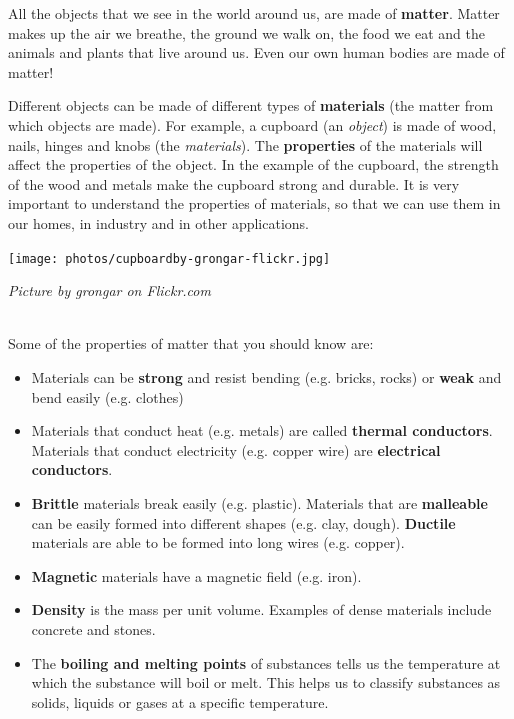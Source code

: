             \label{m38708*id62175}All the objects that we see in the world around us, are made of \textbf{matter}. Matter makes up the air we breathe, the ground we walk on, the food we eat and the animals and plants that live around us. Even our own human bodies are made of matter!\par 
\begin{minipage}{.5\textwidth}
      \label{m38708*id62185}Different objects can be made of different types of \textbf{materials} (the matter from which objects are made). For example, a cupboard (an \textsl{object}) is made of wood, nails, hinges and knobs (the \textsl{materials}). The \textbf{properties} of the materials will affect the properties of the object. In the example of the cupboard, the strength of the wood and metals make the cupboard strong and durable. It is very important to understand the properties of materials, so that we can use them in our homes, in industry and in other applications. \par 
\end{minipage}
\begin{minipage}{.5\textwidth}
\begin{center}
 \texttt{[image: photos/cupboardby-grongar-flickr.jpg]}\par
\textit{Picture by grongar on Flickr.com}
\end{center}
\end{minipage} \\
\label{m38708*id0132}Some of the properties of matter that you should know are:
\label{m38708*lid825}\begin{itemize}[noitemsep]
  \item Materials can be \textbf{strong} and resist bending (e.g. bricks, rocks) or \textbf{weak} and bend easily (e.g. clothes)
  \item Materials that conduct heat (e.g. metals) are called \textbf{thermal conductors}. Materials that conduct electricity (e.g. copper wire) are \textbf{electrical conductors}.
  \item \textbf{Brittle} materials break easily (e.g. plastic). Materials that are \textbf{malleable} can be easily formed into different shapes (e.g. clay, dough). \textbf{Ductile} materials are able to be formed into long wires (e.g. copper).
  \item \textbf{Magnetic} materials have a magnetic field (e.g. iron).
  \item \textbf{Density} is the mass per unit volume. Examples of dense materials include concrete and stones.
  \item The \textbf{boiling and melting points} of substances tells us the temperature at which the substance will boil or melt. This helps us to classify substances as solids, liquids or gases at a specific temperature.\end{itemize}
